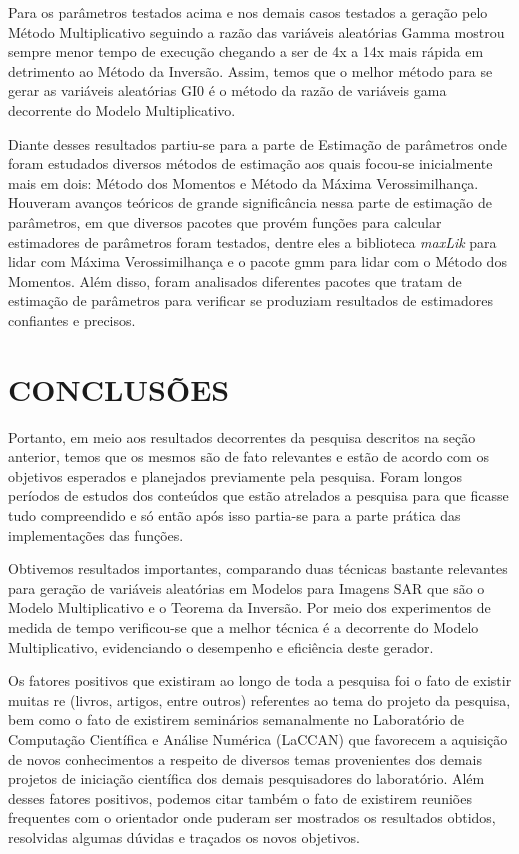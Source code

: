 \documentclass[12pt,letterpaper]{article}
\begin{document}
Para os parâmetros testados acima e nos demais casos testados a geração pelo Método Multiplicativo seguindo a razão das variáveis aleatórias Gamma mostrou sempre menor tempo de execução chegando a ser de 4x a 14x mais rápida em detrimento ao Método da Inversão. Assim, temos que o melhor método para se gerar as variáveis aleatórias GI0 é o método da razão de variáveis gama decorrente do Modelo Multiplicativo.

Diante desses resultados partiu-se para a parte de Estimação de parâmetros onde foram estudados diversos métodos de estimação aos quais focou-se inicialmente mais em dois: Método dos Momentos e Método da Máxima Verossimilhança. Houveram avanços teóricos de grande significância nessa parte de estimação de parâmetros, em que diversos pacotes que provém funções para calcular estimadores de parâmetros foram testados, dentre eles a biblioteca \textit{maxLik} para lidar com Máxima Verossimilhança e o pacote gmm para lidar com o Método dos Momentos. Além disso, foram analisados diferentes pacotes que tratam de estimação de parâmetros para verificar se produziam resultados de estimadores confiantes e precisos.   


\newpage
\section*{\centering \textbf{CONCLUSÕES}} %

Portanto, em meio aos resultados decorrentes da pesquisa descritos na seção anterior, temos que os mesmos são de fato relevantes e estão de acordo com os objetivos esperados e planejados previamente pela pesquisa. Foram longos períodos de estudos dos conteúdos que estão atrelados a pesquisa para que ficasse tudo compreendido e só então após isso partia-se para a parte prática das implementações das funções.

Obtivemos resultados importantes, comparando duas técnicas bastante relevantes para geração de variáveis aleatórias em Modelos para Imagens SAR que são o Modelo Multiplicativo e o Teorema da Inversão. Por meio dos experimentos de medida de tempo verificou-se que a melhor técnica é a decorrente do Modelo Multiplicativo, evidenciando o desempenho e eficiência deste gerador.

Os fatores positivos que existiram ao longo de toda a pesquisa foi o fato de existir muitas re (livros, artigos, entre outros) referentes ao tema do projeto da pesquisa, bem como o fato de existirem seminários semanalmente no Laboratório de Computação Científica e Análise Numérica (LaCCAN) que favorecem a aquisição de novos conhecimentos a respeito de diversos temas provenientes dos demais projetos de
iniciação científica dos demais pesquisadores do laboratório. Além desses fatores positivos, podemos citar também o fato de existirem reuniões frequentes com o orientador onde puderam ser mostrados os resultados obtidos, resolvidas algumas dúvidas e traçados os novos objetivos.
\end{document}
